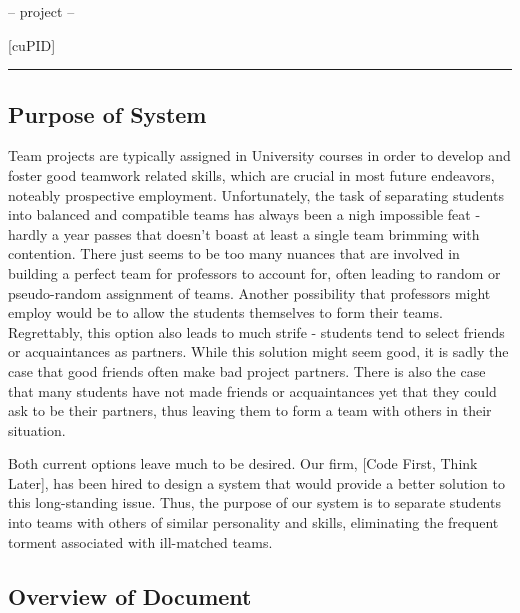 \documentclass[12pt,letterpaper]{article}
\begin{document}
\begin{center}
-- project --
\end{center}

\begin{center}
{\Huge [cuPID]}
\end{center}

\begin{center}
\rule{0.85\textwidth}{0.5pt}
\end{center}

\subsection{Purpose of System}

Team projects are typically assigned in University courses in order to develop and foster
good teamwork related skills, which are crucial in most future endeavors, noteably 
prospective employment. Unfortunately, the task of separating students into balanced 
and compatible teams has always been a nigh impossible feat - hardly a year passes that doesn't
boast at least a single team brimming with  contention. There just seems to be too many
nuances that are involved in building a perfect team for professors to account for, often leading
to random or pseudo-random assignment of teams. Another possibility that professors might employ
would be to allow the students themselves to form their teams. Regrettably, this option also
leads to much strife - students tend to select friends or acquaintances as partners. While this
solution might seem good, it is sadly the case that good friends often make bad project partners. 
There is also the case that many students have not made friends or acquaintances yet that they 
could ask to be their partners, thus leaving them to form a team with others in their situation.

Both current options leave much to be desired. Our firm, [Code First, Think Later], has been hired
to design a system that would provide a better solution to this long-standing issue. Thus, the purpose of
our system is to separate students into teams with others of similar personality and skills, eliminating 
the frequent torment associated with ill-matched teams.

\subsection{Overview of Document}
\end{document}
